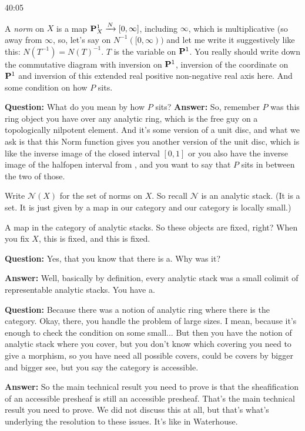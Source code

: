 \begin{example}
\begin{unfinished}{40:05}

A \emph{norm} on $X$ is a map $\P^1_X \xrightarrow{N} [0, \infty]$, including $\infty$, which is multiplicative (so away from $\infty$, so, let's say on $N^{-1} ([0, \infty))$ and let me write it suggestively like this: $N(T^{-1}) = N(T)^{-1}$. $T$ is the variable on $\P^1$. You really should write down the commutative diagram with inversion on $\P^1$, inversion of the coordinate on $\P^1$ and inversion of this extended real positive non-negative real axis here. 
And some condition on how $P$ sits.

\textbf{Question:} What do you mean by how $P$ sits?
\textbf{Answer:} So, remember $P$ was this ring object you have over any analytic ring, which is the free guy on a topologically nilpotent element. And it's some version of a unit disc, and what we ask is that this Norm function gives you another version of the unit disc, which is like the inverse image of the closed interval $[0, 1]$ or you also have the inverse image of the halfopen interval from , and you want to say that $P$ sits in between the two of those.

Write $\mathcal{N}(X)$ for the set of norms on $X$. So recall $\mathcal{N}$ is an analytic stack. (It is a set. It is just given by a map in our category and our category is locally small.)

A map in the category of analytic stacks. So these objects are fixed, right? When you fix $X$, this is fixed, and this is fixed. 

\textbf{Question:} Yes, that you know that there is a. Why was it? 

\textbf{Answer:} Well, basically by definition, every analytic stack was a small colimit of representable analytic stacks. You have a.

\textbf{Question:} Because there was a notion of analytic ring where there is the category. Okay, there, you handle the problem of large sizes. I mean, because it's enough to check the condition on some small... But then you have the notion of analytic stack where you cover, but you don't know which covering you need to give a morphism, so you have need all possible covers, could be covers by bigger and bigger see, but you say the category is accessible. 

\textbf{Answer:}
So the main technical result you need to prove is that the sheafification of an accessible presheaf is still an accessible presheaf. That's the main technical result you need to prove. We did not discuss this at all, but that's what's underlying the resolution to these issues. It's like in Waterhouse.


\end{unfinished}
\end{example}
